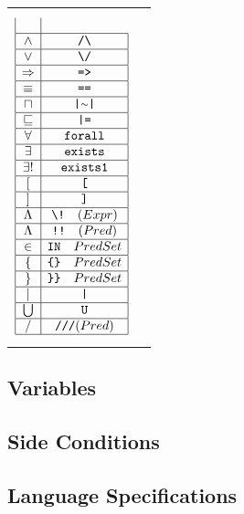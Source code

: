 \begin{center}
\begin{tabular}{p{2in}p{2in}}
$$\begin{array}{|c|c|}
\\\hline \land & \texttt{/\BS}
\\\hline \lor       & \texttt{\BS/}
\\\hline \implies   & \texttt{=>}
\\\hline \equiv     & \texttt{==}
\\\hline \intchoice & \texttt{|\TLD|}
\\\hline \refinedby & \texttt{|=}
\\\hline \forall    & \texttt{forall}
\\\hline \exists    & \texttt{exists}
\\\hline \exists!    & \texttt{exists1}
\\\hline [              & \texttt{[}
\\\hline ]              & \texttt{]}
\\\hline \Lambda      & \texttt{\BS!} \quad (Expr)
\\\hline \Lambda       & \texttt{!!} \quad(Pred)
\\\hline \in          & \texttt{IN}   \quad{PredSet}
\\\hline \{          & \texttt{\{\}}   \quad{PredSet}
\\\hline \}          & \texttt{\}\}}   \quad{PredSet}
\\\hline |            & \texttt{|}
\\\hline \bigcup        & \texttt{U}
\\\hline /       & \texttt{///}  (Pred)
\\\hline
\end{array}
$$
\end{tabular}
\end{center}


\newpage
\subsection{Variables}




\newpage
\subsection{Side Conditions}



\newpage
\subsection{Language Specifications}


